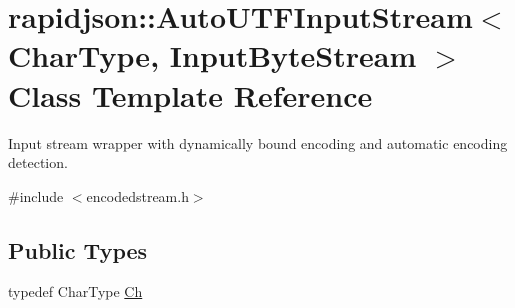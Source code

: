 \hypertarget{classrapidjson_1_1_auto_u_t_f_input_stream}{}\section{rapidjson\+::Auto\+U\+T\+F\+Input\+Stream$<$ Char\+Type, Input\+Byte\+Stream $>$ Class Template Reference}
\label{classrapidjson_1_1_auto_u_t_f_input_stream}


Input stream wrapper with dynamically bound encoding and automatic encoding detection.  




{\ttfamily \#include $<$encodedstream.\+h$>$}

\subsection*{Public Types}
\begin{DoxyCompactItemize}
\item 
typedef Char\+Type \mbox{\hyperlink{classrapidjson_1_1_auto_u_t_f_input_stream_a6d9eca095f7ef8c249ebe43568d66d0e}{Ch}}
\end{DoxyCompactItemize}

